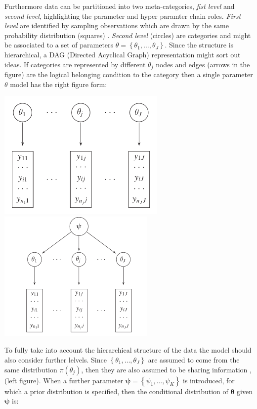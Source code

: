 \documentclass[
  12pt,
  a4paper,
  oneside]{book}
\theoremstyle{definition}
\theoremstyle{definition}
\theoremstyle{definition}
\theoremstyle{remark}
\begin{document}
Furthermore data can be partitioned into two meta-categories, \emph{fist level} and \emph{second level}, highlighting the parameter and hyper paramter chain roles. \emph{First level} are identified by sampling observations which are drawn by the same probability distribution (squares) . \emph{Second level} (circles) are categories and might be associated to a set of parameters \(\theta=\left\{\theta_{1}, \ldots, \theta_{J}\right\}\).
Since the structure is hierarchical, a DAG (Directed Acyclical Graph) \citeyearpar{Blangiardo-Cameletti} representation might sort out ideas. If categories are represented by different \(\theta_{j}\) nodes and edges (arrows in the figure) are the logical belonging condition to the category then a single parameter \(\theta\) model has the right figure form:

\includegraphics{images/thetas.PNG} \includegraphics{images/chis.PNG}

To fully take into account the hierarchical structure of the data the model should also consider further lelvels. Since \(\left\{\theta_{1}, \ldots, \theta_{J}\right\}\) are assumed to come from the same distribution \(\pi(\theta_{j})\), then they are also assumed to be sharing information \citep{Blangiardo-Cameletti}, (left figure). When a further parameter \(\boldsymbol{\psi}=\left\{\psi_{1}, \ldots, \psi_{K}\right\}\) is introduced, for which a prior distribution is specified, then the conditional distribution of \(\boldsymbol{\theta}\) given \(\boldsymbol{\psi}\) is:
\end{document}
